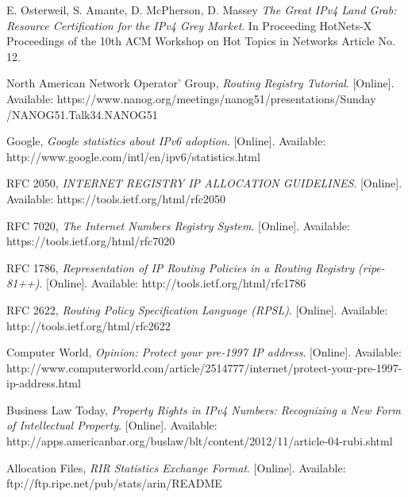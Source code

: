 \documentclass[11pt,a4paper]{scrreprt}
\begin{document}
\begin{thebibliography}{count}
	E. Osterweil, S. Amante, D. McPherson, D. Massey
	\emph{The Great IPv4 Land Grab: Resource Certification for the
IPv4 Grey Market}.
	In Proceeding HotNets-X Proceedings of the 10th ACM Workshop on Hot Topics in Networks Article No. 12.
 
	North American Network Operator' Group,
	\emph{Routing Registry Tutorial}.
	[Online]. Available: https://www.nanog.org/meetings/nanog51/presentations/Sunday
	/NANOG51.Talk34.NANOG51%
	
	Google,
	\emph{Google statistics about IPv6 adoption}.
	[Online]. Available: http://www.google.com/intl/en/ipv6/statistics.html	
	
	RFC 2050,
	\emph{INTERNET REGISTRY IP ALLOCATION GUIDELINES}.
	[Online]. Available: https://tools.ietf.org/html/rfc2050	
	
	RFC 7020,
	\emph{The Internet Numbers Registry System}.
	[Online]. Available: https://tools.ietf.org/html/rfc7020
	
	RFC 1786,
	\emph{Representation of IP Routing Policies in a Routing Registry (ripe-81++)}.
	[Online]. Available: http://tools.ietf.org/html/rfc1786
	
	RFC 2622,
	\emph{Routing Policy Specification Language (RPSL)}.
	[Online]. Available: http://tools.ietf.org/html/rfc2622
	
	
	Computer World,
	\emph{Opinion: Protect your pre-1997 IP address}.
	[Online]. Available: http://www.computerworld.com/article/2514777/internet/protect-your-pre-1997-ip-address.html
	
	Business Law Today,
	\emph{Property Rights in IPv4 Numbers: Recognizing a New Form of Intellectual Property}.
	[Online]. Available: http://apps.americanbar.org/buslaw/blt/content/2012/11/article-04-rubi.shtml
	
	Allocation Files,
	\emph{RIR Statistics Exchange Format}.
	[Online]. Available: ftp://ftp.ripe.net/pub/stats/arin/README
	
	
\end{thebibliography}	
\end{document}
